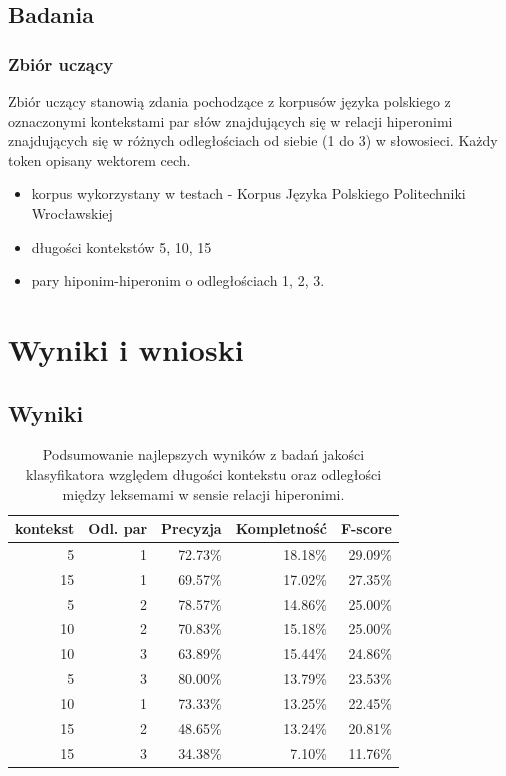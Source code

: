 \documentclass[a4paper,10pt]{report}
\begin{document}
\section{Badania}

\subsection{Zbiór uczący}

Zbiór uczący stanowią zdania pochodzące z korpusów języka polskiego z oznaczonymi kontekstami par słów znajdujących się w relacji hiperonimi znajdujących się w różnych odległościach od siebie (1 do 3) w słowosieci. Każdy token opisany wektorem cech.

\begin{itemize}
 \item korpus wykorzystany w testach - Korpus Języka Polskiego Politechniki Wrocławskiej
 \item długości kontekstów 5, 10, 15
 \item pary hiponim-hiperonim o odległościach 1, 2, 3.
\end{itemize}

\chapter{Wyniki i wnioski}

\section{Wyniki}

\begin{table}[htp]
  \centering
    \begin{tabular}{rrrrr}
    \toprule
    \multicolumn{1}{c}{kontekst} & \multicolumn{1}{c}{Odl. par} & \multicolumn{1}{c}{Precyzja} & \multicolumn{1}{c}{Kompletność} & \multicolumn{1}{c}{F-score} \\
    \midrule
    5     & 1     & 72.73\% & 18.18\% & 29.09\% \\
    15    & 1     & 69.57\% & 17.02\% & 27.35\% \\
    5     & 2     & 78.57\% & 14.86\% & 25.00\% \\
    10    & 2     & 70.83\% & 15.18\% & 25.00\% \\
    10    & 3     & 63.89\% & 15.44\% & 24.86\% \\
    5     & 3     & 80.00\% & 13.79\% & 23.53\% \\
    10    & 1     & 73.33\% & 13.25\% & 22.45\% \\
    15    & 2     & 48.65\% & 13.24\% & 20.81\% \\
    15    & 3     & 34.38\% & 7.10\% & 11.76\% \\
    \bottomrule
    \end{tabular}%
    \caption{Podsumowanie najlepszych wyników z badań jakości klasyfikatora względem długości kontekstu oraz odległości między leksemami w sensie relacji hiperonimi.}
  \label{tab:wyniki-podsum}%
\end{table}%
\end{document}
